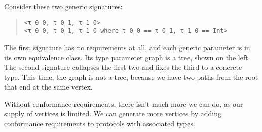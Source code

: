 \documentclass[../generics]{subfiles}
\begin{document}
\begin{example}
Consider these two generic signatures:
\begin{quote}
\begin{verbatim}
<τ_0_0, τ_0_1, τ_1_0>
<τ_0_0, τ_0_1, τ_1_0 where τ_0_0 == τ_0_1, τ_1_0 == Int>
\end{verbatim}
\end{quote}
The first signature has no requirements at all, and each generic parameter is in its own equivalence class. Its type parameter graph is a tree, shown on the left. The second signature collapses the first two and fixes the third to a concrete type. This time, the graph is not a tree, because we have two paths from the root that end at the same vertex.
\begin{center}
\qquad
{}
\end{center}
\end{example}

Without conformance requirements, there isn't much more we can do, as our supply of vertices is limited. We can generate more vertices by adding conformance requirements to protocols with associated types.
\end{document}
